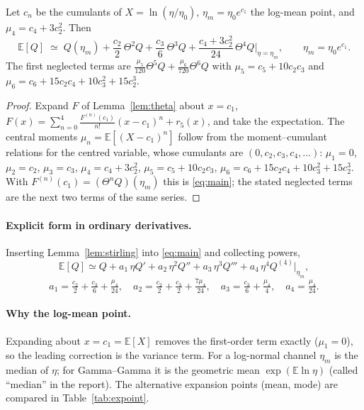\begin{theorem}\label{thm:main}
Let $c_n$ be the cumulants of $X=\ln(\eta/\eta_0)$, $\eta_m=\eta_0e^{c_1}$ the log-mean point, and $\mu_4=c_4+3c_2^2$. Then
\begin{equation}
  \boxed{\;
  \mathbb E[Q]\;\simeq\;Q(\eta_m)+\frac{c_2}{2}\,\Theta^2Q+\frac{c_3}{6}\,\Theta^3Q+\frac{c_4+3c_2^{2}}{24}\,\Theta^4Q\Big|_{\eta=\eta_m},\qquad \eta_m=\eta_0e^{c_1}.\;}
  \label{eq:main}
\end{equation}
The first neglected terms are $\frac{\mu_5}{120}\Theta^5Q+\frac{\mu_6}{720}\Theta^6Q$ with $\mu_5=c_5+10c_2c_3$ and $\mu_6=c_6+15c_2c_4+10c_3^2+15c_2^3$.
\end{theorem}
\begin{proof}
Expand $F$ of Lemma~\ref{lem:theta} about $x=c_1$,
$F(x)=\sum_{n=0}^{4}\frac{F^{(n)}(c_1)}{n!}(x-c_1)^n+r_5(x)$, and take the expectation. The central moments $\mu_n=\mathbb E[(X-c_1)^n]$ follow from the moment--cumulant relations for the centred variable, whose cumulants are $(0,c_2,c_3,c_4,\dots)$: $\mu_1=0$, $\mu_2=c_2$, $\mu_3=c_3$, $\mu_4=c_4+3c_2^2$, $\mu_5=c_5+10c_2c_3$, $\mu_6=c_6+15c_2c_4+10c_3^2+15c_2^3$. With $F^{(n)}(c_1)=(\Theta^nQ)(\eta_m)$ this is \eqref{eq:main}; the stated neglected terms are the next two terms of the same series.
\end{proof}

\paragraph{Explicit form in ordinary derivatives.}
Inserting Lemma~\ref{lem:stirling} into \eqref{eq:main} and collecting powers,
\begin{equation}
  \mathbb E[Q]\simeq Q+a_1\,\eta Q'+a_2\,\eta^2Q''+a_3\,\eta^3Q'''+a_4\,\eta^4Q^{(4)}\Big|_{\eta_m},
\end{equation}
\begin{equation}
  a_1=\tfrac{c_2}{2}+\tfrac{c_3}{6}+\tfrac{\mu_4}{24},\quad
  a_2=\tfrac{c_2}{2}+\tfrac{c_3}{2}+\tfrac{7\mu_4}{24},\quad
  a_3=\tfrac{c_3}{6}+\tfrac{\mu_4}{4},\quad
  a_4=\tfrac{\mu_4}{24}.
\end{equation}

\paragraph{Why the log-mean point.}
Expanding about $x=c_1=\mathbb E[X]$ removes the first-order term exactly ($\mu_1=0$), so the leading correction is the variance term. For a log-normal channel $\eta_m$ is the median of $\eta$; for Gamma--Gamma it is the geometric mean $\exp(\mathbb E\ln\eta)$ (called ``median'' in the report). The alternative expansion points (mean, mode) are compared in Table~\ref{tab:expoint}.

